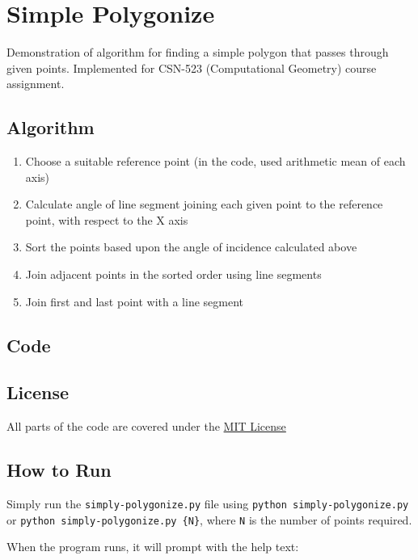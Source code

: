 \documentclass[a4paper, 12pt]{report}
\begin{document}
\section*{Simple Polygonize}

Demonstration of algorithm for finding a simple polygon that passes through given points. Implemented for CSN-523 (Computational Geometry) course assignment.

\subsection*{Algorithm}

\begin{enumerate}
\item Choose a suitable reference point (in the code, used arithmetic mean of each axis)
\item Calculate angle of line segment joining each given point to the reference point, with respect to the X axis
\item Sort the points based upon the angle of incidence calculated above
\item Join adjacent points in the sorted order using line segments
\item Join first and last point with a line segment
\end{enumerate}

\subsection*{Code}




\subsection*{License}

All parts of the code are covered under the \href{https://jay.mit-license.org/2017}{MIT License}

\subsection*{How to Run}

Simply run the \verb|simply-polygonize.py| file using \verb|python simply-polygonize.py| or \verb|python simply-polygonize.py {N}|, where \verb|N| is the number of points required.

When the program runs, it will prompt with the help text:
\end{document}
